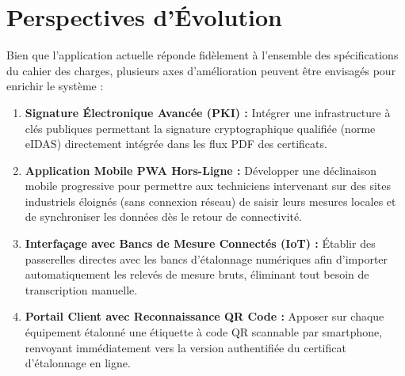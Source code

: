 \documentclass{bts-report}
\begin{document}
\section*{Perspectives d'\'Evolution}
Bien que l'application actuelle r\'eponde fid\`element \`a l'ensemble des sp\'ecifications du cahier des charges, plusieurs axes d'am\'elioration peuvent \^etre envisag\'es pour enrichir le syst\`eme :
\begin{enumerate}
  \item \textbf{Signature \'Electronique Avanc\'ee (PKI) :} Int\'egrer une infrastructure \`a cl\'es publiques permettant la signature cryptographique qualifi\'ee (norme eIDAS) directement int\'egr\'ee dans les flux PDF des certificats.
  \item \textbf{Application Mobile PWA Hors-Ligne :} D\'evelopper une d\'eclinaison mobile progressive pour permettre aux techniciens intervenant sur des sites industriels \'eloign\'es (sans connexion r\'eseau) de saisir leurs mesures locales et de synchroniser les donn\'ees d\`es le retour de connectivit\'e.
  \item \textbf{Interfa\c{c}age avec Bancs de Mesure Connect\'es (IoT) :} \'Etablir des passerelles directes avec les bancs d'\'etalonnage num\'eriques afin d'importer automatiquement les relev\'es de mesure bruts, \'eliminant tout besoin de transcription manuelle.
  \item \textbf{Portail Client avec Reconnaissance QR Code :} Apposer sur chaque \'equipement \'etalonn\'e une \'etiquette \`a code QR scannable par smartphone, renvoyant imm\'ediatement vers la version authentifi\'ee du certificat d'\'etalonnage en ligne.
\end{enumerate}


\backmatter

\bibliographysection
\end{document}
